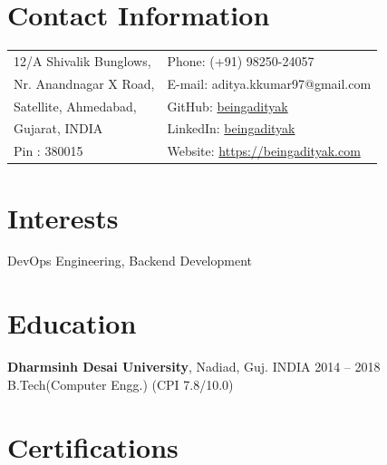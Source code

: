 \documentclass[margin,line]{res}
\begin{document}
 \hfill
{}

\begin{resume}
\section{\sc Contact Information}

\vspace{.05in}
\begin{tabular}{@{}p{3.5in}p{3in}}
12/A Shivalik Bunglows, & {Phone:}  (+91) 98250-24057 \\
Nr. Anandnagar X Road,  & {E-mail:}  aditya.kkumar97@gmail.com\\
Satellite, Ahmedabad,  & {GitHub:} \href{https://github.com/beingadityak}{beingadityak}\\
Gujarat, INDIA  & {LinkedIn:} \href{https://www.linkedin.com/in/beingadityak}{beingadityak}\\
Pin : 380015 & {Website:} \url{https://beingadityak.com}
\end{tabular}


\section{\sc Interests}

DevOps Engineering, Backend Development

\section{\sc Education}
{\bf Dharmsinh Desai University}, Nadiad, Guj. INDIA \hfill 2014 -- 2018\\
B.Tech(Computer Engg.) \hfill(CPI 7.8/10.0)

\section{\sc Certifications}


\end{resume}
\end{document}
